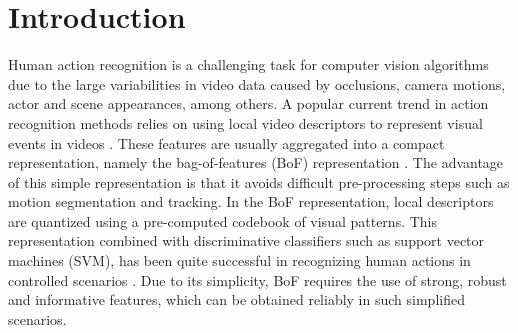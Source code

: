 \section{Introduction} \label{introduction}
Human action recognition is a challenging task for computer vision algorithms due to the large variabilities in video data caused by occlusions, camera motions, actor and scene appearances, among others. A popular current trend in action recognition methods relies on using local video descriptors to represent visual events in videos \cite{laptev2005, dollar2005, wang2011}. These features are usually aggregated into a compact representation, namely the bag-of-features (BoF) representation \cite{laptev2008}. The advantage of this simple representation is that it avoids difficult pre-processing steps such as motion segmentation and tracking. In the BoF representation, local descriptors are quantized using a pre-computed codebook of visual patterns. This representation combined with discriminative classifiers such as support vector machines (SVM), has been quite successful in recognizing human actions  in controlled scenarios \cite{blank2005, schuldt2004}. Due to its simplicity, BoF requires the use of strong, robust and informative features, which can be obtained reliably in such simplified scenarios.

